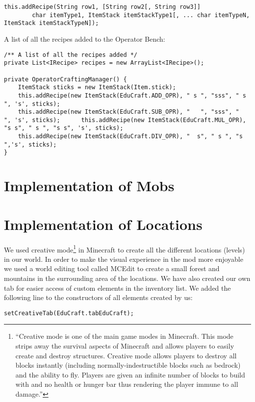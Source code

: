 \begin{lstlisting}
this.addRecipe(String row1, [String row2[, String row3]]
        char itemType1, ItemStack itemStackType1[, ... char itemTypeN, ItemStack itemStackTypeN]);
\end{lstlisting}

A list of all the recipes added to the Operator Bench:
\begin{lstlisting}
/** A list of all the recipes added */
private List<IRecipe> recipes = new ArrayList<IRecipe>();

private OperatorCraftingManager() {
	ItemStack sticks = new ItemStack(Item.stick);
	this.addRecipe(new ItemStack(EduCraft.ADD_OPR), " s ", "sss", " s ", 's', sticks);
	this.addRecipe(new ItemStack(EduCraft.SUB_OPR), "   ", "sss", "   ", 's', sticks);		this.addRecipe(new ItemStack(EduCraft.MUL_OPR), "s s", " s ", "s s", 's', sticks);
	this.addRecipe(new ItemStack(EduCraft.DIV_OPR), "  s", " s ", "s  ",'s', sticks);
}
\end{lstlisting}

\section{Implementation of Mobs}
\section{Implementation of Locations}
We used creative mode\footnote{``Creative mode is one of the main game modes in Minecraft. This mode strips away the survival aspects of Minecraft and allows players to easily create and destroy structures. Creative mode allows players to destroy all blocks instantly (including normally-indestructible blocks such as bedrock) and the ability to fly. Players are given an infinite number of blocks to build with and no health or hunger bar thus rendering the player immune to all damage.''\cite{website:minecraft-creative}} in Minecraft to create all the different locations (levels) in our world. In order to make the visual experience in the mod more enjoyable we used a world editing tool called MCEdit to create a small forest and mountains in the surrounding area of the locations.
We have also created our own tab for easier access of custom elements in the inventory list. We added the following line to the constructors of all elements created by us:
\begin{lstlisting}
setCreativeTab(EduCraft.tabEduCraft);
\end{lstlisting}

